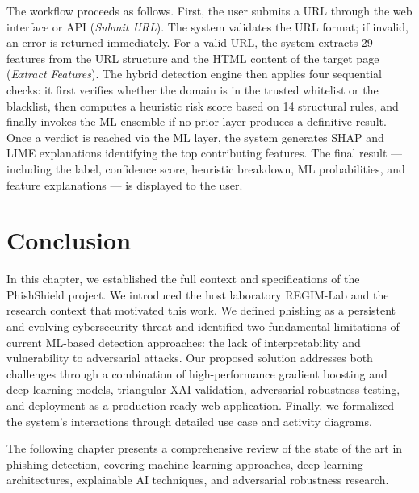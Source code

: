 The workflow proceeds as follows. First, the user submits a URL through the web interface or API (\textit{Submit URL}). The system validates the URL format; if invalid, an error is returned immediately. For a valid URL, the system extracts 29 features from the URL structure and the HTML content of the target page (\textit{Extract Features}). The hybrid detection engine then applies four sequential checks: it first verifies whether the domain is in the trusted whitelist or the blacklist, then computes a heuristic risk score based on 14 structural rules, and finally invokes the ML ensemble if no prior layer produces a definitive result. Once a verdict is reached via the ML layer, the system generates SHAP and LIME explanations identifying the top contributing features. The final result — including the label, confidence score, heuristic breakdown, ML probabilities, and feature explanations — is displayed to the user.

\section*{Conclusion}

In this chapter, we established the full context and specifications of the PhishShield project. We introduced the host laboratory REGIM-Lab and the research context that motivated this work. We defined phishing as a persistent and evolving cybersecurity threat and identified two fundamental limitations of current ML-based detection approaches: the lack of interpretability and vulnerability to adversarial attacks. Our proposed solution addresses both challenges through a combination of high-performance gradient boosting and deep learning models, triangular XAI validation, adversarial robustness testing, and deployment as a production-ready web application. Finally, we formalized the system's interactions through detailed use case and activity diagrams.

The following chapter presents a comprehensive review of the state of the art in phishing detection, covering machine learning approaches, deep learning architectures, explainable AI techniques, and adversarial robustness research.

